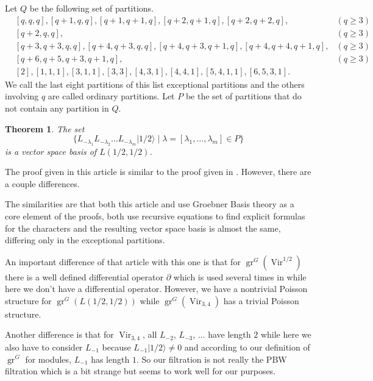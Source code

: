 \documentclass[12pt, a4paper]{article}
\newtheorem{theorem}{Theorem}
\DeclareMathOperator{\Vir}{Vir}
\DeclareMathOperator{\gr}{gr}
\newcommand{\vachalf}{|1/2\rangle}
\begin{document}
Let $Q$ be the following set of partitions.
\begin{align*}
  &[q, q, q], [q + 1, q, q], [q + 1, q + 1, q], [q + 2, q + 1, q], [q + 2, q + 2, q], &(q \ge 3) \\
  &[q + 2, q, q], &(q \ge 3) \\
  &[q + 3, q + 3, q, q], [q + 4, q + 3, q, q],  [q + 4, q + 3, q + 1, q], [q + 4, q + 4, q + 1, q], &(q \ge 3) \\
  &[q + 6, q + 5, q + 3, q + 1, q], &(q \ge 3) \\
  &[2], [1, 1, 1], [3, 1, 1], [3, 3], [4, 3, 1], [4, 4, 1], [5, 4, 1, 1], [6, 5, 3, 1].
\end{align*}
We call the last eight partitions of this list exceptional partitions and the others involving $q$ are called ordinary partitions.
Let $P$ be the set of partitions that do not contain any partition in $Q$.

\begin{theorem}
  \label{thr:4}
  The set
  \begin{equation*}
    \{L_{-\lambda_1}L_{-\lambda_2}\dots L_{-\lambda_m}\vachalf \mid \lambda=[\lambda_1, \dots, \lambda_m] \in P\}
  \end{equation*}
  is a vector space basis of $L(1/2, 1/2)$.
\end{theorem}

The proof given in this article is similar to the proof given in \cite{andrews_singular_2022}.
However, there are a couple differences.

The similarities are that both this article and \cite{andrews_singular_2022} use Groebner Basis theory as a core element of the proofs, both use recursive equations to find explicit formulas for the characters and the resulting vector space basis is almost the same, differing only in the exceptional partitions.

An important difference of that article with this one is that for $\gr^G(\Vir^{1/2})$ there is a well defined differential operator $\partial$ which is used several times in \cite{andrews_singular_2022} while here we don't have a differential operator.
However, we have a nontrivial Poisson structure for $\gr^G(L(1/2, 1/2))$ while $\gr^G(\Vir_{3, 4})$ has a trivial Poisson structure.

Another difference is that for $\Vir_{3,4}$, all $L_{-2}$, $L_{-3}$, $\dots$ have length $2$ while here we also have to consider $L_{-1}$ because $L_{-1}\vachalf \neq 0$ and according to our definition of $\gr^G$ for modules, $L_{-1}$ has length $1$.
So our filtration is not really the PBW filtration which is a bit strange but seems to work well for our purposes.
\end{document}
